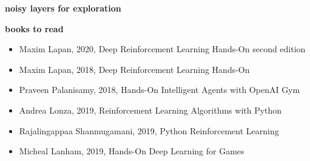 \documentclass[xcolor=dvipsnames]{beamer}
\begin{document}
\begin{frame}{\bf noisy layers for exploration}






\end{frame}



\begin{frame}{\bf books to read}

\begin{itemize}
  \item Maxim Lapan, 2020, Deep Reinforcement Learning Hands-On second edition
  \item Maxim Lapan, 2018, Deep Reinforcement Learning Hands-On
  \item Praveen Palanisamy, 2018, Hands-On Intelligent Agents with OpenAI Gym
  \item Andrea Lonza, 2019, Reinforcement Learning Algorithms with Python
  \item Rajalingappaa Shanmugamani, 2019, Python Reinforcement Learning
  \item Micheal Lanham, 2019, Hands-On Deep Learning for Games
\end{itemize}


\end{frame}
\end{document}
